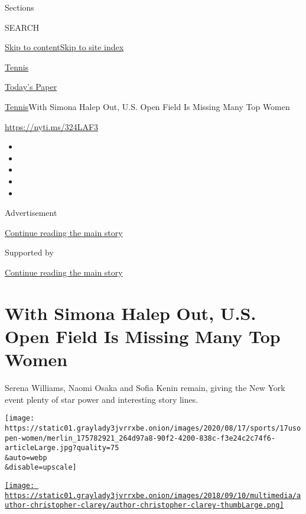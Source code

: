 Sections

SEARCH

\protect\hyperlink{site-content}{Skip to
content}\protect\hyperlink{site-index}{Skip to site index}

\href{https://www.nytimes3xbfgragh.onion/section/sports/tennis}{Tennis}

\href{https://myaccount.nytimes3xbfgragh.onion/auth/login?response_type=cookie\&client_id=vi}{}

\href{https://www.nytimes3xbfgragh.onion/section/todayspaper}{Today's
Paper}

\href{/section/sports/tennis}{Tennis}\textbar{}With Simona Halep Out,
U.S. Open Field Is Missing Many Top Women

\url{https://nyti.ms/324LAF3}

\begin{itemize}
\item
\item
\item
\item
\item
\end{itemize}

Advertisement

\protect\hyperlink{after-top}{Continue reading the main story}

Supported by

\protect\hyperlink{after-sponsor}{Continue reading the main story}

\hypertarget{with-simona-halep-out-us-open-field-is-missing-many-top-women}{%
\section{With Simona Halep Out, U.S. Open Field Is Missing Many Top
Women}\label{with-simona-halep-out-us-open-field-is-missing-many-top-women}}

Serena Williams, Naomi Osaka and Sofia Kenin remain, giving the New York
event plenty of star power and interesting story lines.

\texttt{[image: https://static01.graylady3jvrrxbe.onion/images/2020/08/17/sports/17usopen-women/merlin\_175782921\_264d97a8-90f2-4200-838c-f3e24c2c74f6-articleLarge.jpg?quality=75\\\&auto=webp\\\&disable=upscale]}

\href{https://www.nytimes3xbfgragh.onion/by/christopher-clarey}{\texttt{[image: https://static01.graylady3jvrrxbe.onion/images/2018/09/10/multimedia/author-christopher-clarey/author-christopher-clarey-thumbLarge.png]}}

